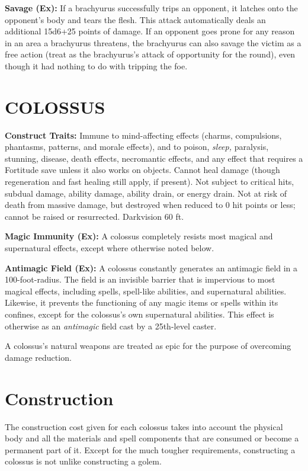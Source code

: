 \documentclass{article}
\begin{document}
\textbf{Savage (Ex):} If a brachyurus successfully trips an opponent, it latches 
onto the opponent's body and tears the flesh. This attack automatically deals an 
additional 15d6+25 points of damage. If an opponent goes prone for any reason in 
an area a brachyurus threatens, the brachyurus can also savage the victim as a 
free action (treat as the brachyurus's attack of opportunity for the round), even 
though it had nothing to do with tripping the foe. 

\vspace{12pt}
\section*{{\LARGE{}COLOSSUS }}

\textbf{Construct Traits:} Immune to mind-affecting effects (charms, compulsions, 
phantasms, patterns, and morale effects), and to poison, \textit{sleep, }paralysis, 
stunning, disease, death effects, necromantic effects, and any effect that requires 
a Fortitude save unless it also works on objects. Cannot heal damage (though regeneration 
and fast healing still apply, if present). Not subject to critical hits, subdual 
damage, ability damage, ability drain, or energy drain. Not at risk of death from 
massive damage, but destroyed when reduced to 0 hit points or less; cannot be raised 
or resurrected. Darkvision 60 ft. 

\textbf{Magic Immunity (Ex):} A colossus completely resists most magical and supernatural 
effects, except where otherwise noted below. 

\textbf{Antimagic Field (Ex):} A colossus constantly generates an antimagic field 
in a 100-foot-radius. The field is an invisible barrier that is impervious to most 
magical effects, including spells, spell-like abilities, and supernatural abilities. 
Likewise, it prevents the functioning of any magic items or spells within its confines, 
except for the colossus's own supernatural abilities. This effect is otherwise 
as an \textit{antimagic }field cast by a 25th-level caster. 

A colossus's natural weapons are treated as epic for the purpose of overcoming 
damage reduction.

\section*{Construction }

The construction cost given for each colossus takes into account the physical body 
and all the materials and spell components that are consumed or become a permanent 
part of it. Except for the much tougher requirements, constructing a colossus is 
not unlike constructing a golem. 
\end{document}
